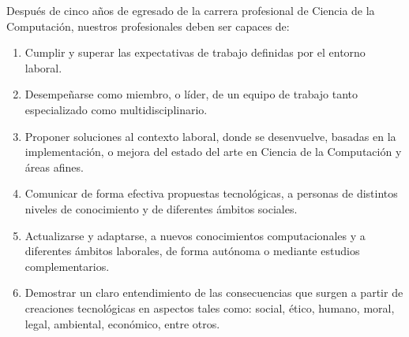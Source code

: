 Después de cinco años de egresado de la carrera profesional de Ciencia de la Computación, nuestros profesionales deben ser capaces de:
\begin{enumerate}
\item Cumplir y superar las expectativas de trabajo definidas por el entorno laboral.
\item Desempeñarse como miembro, o líder, de un equipo de trabajo tanto especializado como multidisciplinario.
\item Proponer soluciones al contexto laboral, donde se desenvuelve, basadas en la implementación, o mejora del estado del arte en Ciencia de la Computación y áreas afines.
\item Comunicar de forma efectiva propuestas tecnológicas, a personas de distintos niveles de conocimiento y de diferentes ámbitos sociales.  
\item Actualizarse y adaptarse, a nuevos conocimientos computacionales y a diferentes ámbitos laborales, de forma autónoma o mediante estudios complementarios.
\item Demostrar un claro entendimiento de las consecuencias que surgen a partir de creaciones tecnológicas en aspectos tales como: social, ético, humano, moral, legal, ambiental, económico, entre otros.

\end{enumerate}

